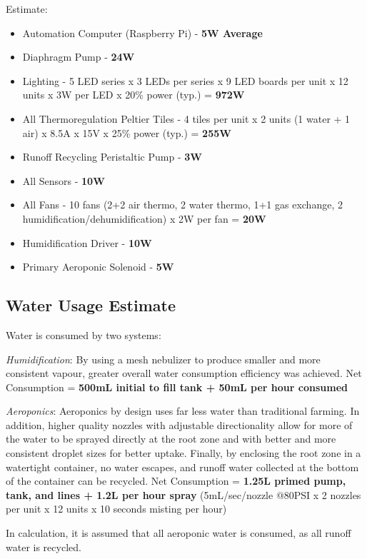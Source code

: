 \documentclass{report}
\begin{document}
Estimate:
\begin{itemize}
    \item Automation Computer (Raspberry Pi) - \textbf{5W Average}
    \item Diaphragm Pump - \textbf{24W} 
    \item Lighting - 5 LED series x 3 LEDs per series x 9 LED boards per unit x 12 units x 3W per LED x 20\% power (typ.) = \textbf{972W}
    \item All Thermoregulation Peltier Tiles - 4 tiles per unit x 2 units (1 water + 1 air) x 8.5A x 15V x 25\% power (typ.) = \textbf{255W}
    \item Runoff Recycling Peristaltic Pump - \textbf{3W}
    \item All Sensors - \textbf{10W}
    \item All Fans - 10 fans (2+2 air thermo, 2 water thermo, 1+1 gas exchange, 2 humidification/dehumidification) x 2W per fan = \textbf{20W}
    \item Humidification Driver - \textbf{10W}
    \item Primary Aeroponic Solenoid - \textbf{5W}
\end{itemize}

\subsection{Water Usage Estimate}
\label{app:water}

Water is consumed by two systems:

\textit{Humidification}: By using a mesh nebulizer to produce smaller and more consistent vapour, greater overall water consumption efficiency was achieved. Net Consumption = \textbf{500mL initial to fill tank + 50mL per hour consumed}

\textit{Aeroponics}: Aeroponics by design uses far less water than traditional farming. In addition, higher quality nozzles with adjustable directionality allow for more of the water to be sprayed directly at the root zone and with better and more consistent droplet sizes for better uptake. Finally, by enclosing the root zone in a watertight container, no water escapes, and runoff water collected at the bottom of the container can be recycled. Net Consumption = \textbf{1.25L primed pump, tank, and lines + 1.2L per hour spray} (5mL/sec/nozzle @80PSI x 2 nozzles per unit x 12 units x 10 seconds misting per hour)

In calculation, it is assumed that all aeroponic water is consumed, as all runoff water is recycled.
\end{document}

